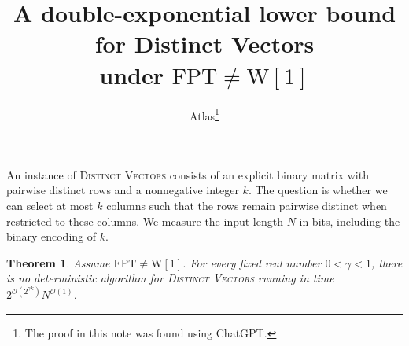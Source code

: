 \documentclass[11pt]{article}
\title{A double-exponential lower bound for Distinct Vectors\\under \(\mathrm{FPT}\ne\mathrm{W[1]}\)}
\author{Atlas\thanks{The proof in this note was found using ChatGPT.}}
\date{}
\newtheorem{theorem}{Theorem}
\newcommand{\problem}[1]{\textsc{#1}}
\begin{document}
\maketitle

An instance of \problem{Distinct Vectors} consists of an explicit binary
matrix with pairwise distinct rows and a nonnegative integer \(k\). The
question is whether we can select at most \(k\) columns such that the rows
remain pairwise distinct when restricted to these columns. We measure the
input length \(N\) in bits, including the binary encoding of \(k\).

\hypertarget{dv-fixed-coefficient}{}\begin{theorem}\label{thm:dv}
Assume \(\mathrm{FPT}\ne\mathrm{W[1]}\). For every fixed real number
\(0<\gamma<1\), there is no deterministic algorithm for
\problem{Distinct Vectors} running in time
\(2^{\mathcal O(2^{\gamma k})}N^{\mathcal O(1)}\).
\end{theorem}
\end{document}
